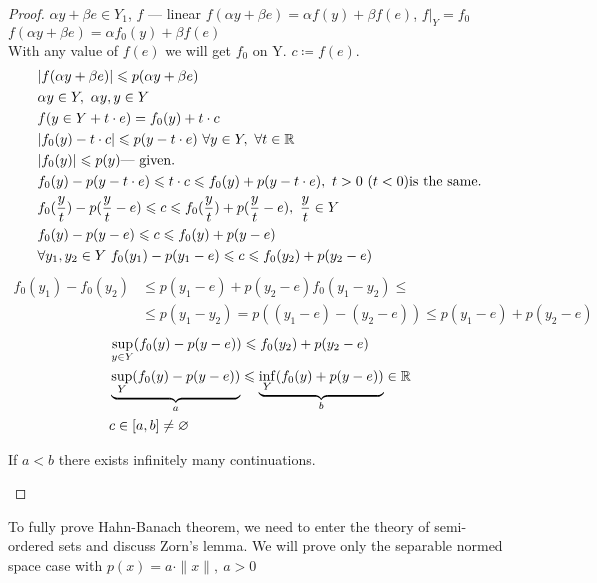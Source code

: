 \begin{proof}
  $\alpha y + \beta e \in Y_1$, $f$ --- linear $f(\alpha y + \beta e) = \alpha
  f(y) + \beta f(e)$, $f|_Y = f_0$ \\
  $f(\alpha y + \beta e) = \alpha f_0(y) + \beta f(e)$ \\
  With any value of $f(e)$ we will get $f_0$ on Y. $c \coloneqq f(e)$. 
  \begin{align*}
    &|f(\alpha y + \beta e)| \leq p(\alpha y + \beta e) \\
    &\alpha y \in Y,\ \alpha y, y \in Y \\
    &f(y \in Y + t \cdot e) = f_0(y) + t \cdot c \\
    &|f_0(y) - t \cdot c| \leq p(y - t \cdot e)\ \forall y \in Y,\ \forall t \in \R \\
    &|f_0(y)| \leq p(y) \text{--- given}. \\
    &f_0(y) - p(y - t \cdot e) \leq t \cdot c \leq f_0(y) + p(y - t \cdot e),\ t >
      0\ (t < 0) \text{is the same}. \\
    &f_0(\dfrac{y}{t}) - p(\dfrac{y}{t} - e) \leq c \leq f_0(\dfrac{y}{t}) +
      p(\dfrac{y}{t} - e),\ \dfrac{y}{t} \in Y \\
    &f_0(y) - p(y - e) \leq c \leq f_0(y) + p(y - e) \\
    &\forall y_1, y_2 \in Y\ f_0(y_1) - p(y_1 - e) \leq c \leq f_0(y_2) + p(y_2 -
      e)
  \end{align*}
  \begin{align*}
    f_0(y_1) - f_0(y_2) &\leq p(y_1 - e) + p(y_2 - e) f_0(y_1 - y_2) \leq \\ 
                        &\leq p(y_1 - y_2) = p((y_1 - e) - (y_2 - e)) \leq p(y_1 - e) + p(y_2 - e)
  \end{align*}
  \begin{align*}
    &\sup\limits_{y \in Y}(f_0(y) - p(y - e)) \leqslant f_0(y_2) + p(y_2 - e) \\
    &\underbrace{\sup\limits_Y (f_0(y) - p(y - e))}_{a} \leqslant \underbrace{\inf\limits_Y (f_0(y) + p(y - e))}_{b}
      \in \mathbb{R} \\
    &c \in [a, b] \neq \varnothing \qedhere
  \end{align*}
  \begin{note}
    If $a < b$ there exists infinitely many continuations.
  \end{note}
\end{proof}

To fully prove Hahn-Banach theorem, we need to enter the theory of semi-ordered
sets and discuss Zorn's lemma. We will prove only the separable normed space case with
$p(x) = a \cdot \|x\|,\ a > 0$ 

